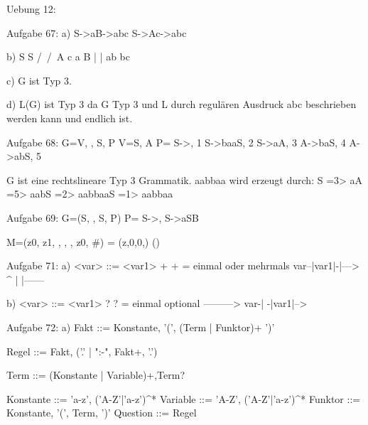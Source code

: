 Uebung 12:

Aufgabe 67:
a)
S->aB->abc
S->Ac->abc

b)
  S		S
  /\	/\
  A c	a B
  |		  |
 ab		  bc
 
c)
G ist Typ 3.

d)
L(G) ist Typ 3 da G Typ 3 und L
durch regulären Ausdruck abc beschrieben werden kann und endlich ist.


Aufgabe 68:
G={V, \sigma, S, P}
V={S, A}
P={
S->\epsilon,	1
S->baaS,		2
S->aA,			3
A->baS,			4
A->abS,			5
}

G ist eine rechtslineare Typ 3 Grammatik.
aabbaa wird erzeugt durch:
S =3> aA =5> aabS =2> aabbaaS =1> aabbaa


Aufgabe 69:
G=(S, \Sigma, S, P)
P={
S->\epsilon,
S->aSB
}

M=({z0, z1}, \Sigma, \Gamma, \Delta, z0, #)
\Delta ={
(z,0,0,\epsilon)
()
}


Aufgabe 71:
a) <var> ::= <var1> +
+ = einmal oder mehrmals
var--|var1|-|--->
	 ^		|
	 |------

b) <var> ::= <var1> ?
? = einmal optional
	 --------->
var-|
     -|var1|-->


Aufgabe 72:
a)
Fakt ::= Konstante, '(', (Term | Funktor)+ ')' 

Regel ::= Fakt, ('.' | ":-", Fakt+, '.')

Term ::= (Konstante | Variable)+,Term?

Konstante ::= 'a-z', ('A-Z'|'a-z')^*
Variable ::= 'A-Z', ('A-Z'|'a-z')^*
Funktor ::= Konstante, '(', Term, ')'
Question ::= Regel